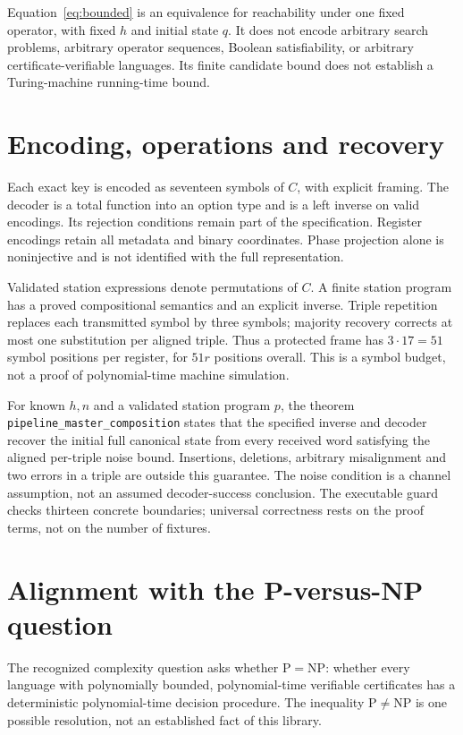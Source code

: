 \documentclass[11pt]{article}
\begin{document}
Equation~\eqref{eq:bounded} is an equivalence for reachability under one fixed
operator, with fixed $h$ and initial state $q$. It does not encode arbitrary
search problems, arbitrary operator sequences, Boolean satisfiability, or
arbitrary certificate-verifiable languages. Its finite candidate bound does
not establish a Turing-machine running-time bound.

\section{Encoding, operations and recovery}
Each exact key is encoded as seventeen symbols of $C$, with explicit framing.
The decoder is a total function into an option type and is a left inverse on
valid encodings. Its rejection conditions remain part of the specification.
Register encodings retain all metadata and binary coordinates. Phase projection
alone is noninjective and is not identified with the full representation.

Validated station expressions denote permutations of $C$. A finite station
program has a proved compositional semantics and an explicit inverse. Triple
repetition replaces each transmitted symbol by three symbols; majority recovery
corrects at most one substitution per aligned triple. Thus a protected frame has
$3\cdot17=51$ symbol positions per register, for $51r$ positions overall.
This is a symbol budget, not a proof of polynomial-time machine simulation.

For known $h,n$ and a validated station program $p$, the theorem
\texttt{pipeline\_master\_composition} states that the specified inverse and
decoder recover the initial full canonical state from every received word
satisfying the aligned per-triple noise bound. Insertions, deletions, arbitrary
misalignment and two errors in a triple are outside this guarantee. The noise
condition is a channel assumption, not an assumed decoder-success conclusion.
The executable guard checks thirteen concrete boundaries; universal correctness
rests on the proof terms, not on the number of fixtures.

\section{Alignment with the P-versus-NP question}
The recognized complexity question asks whether $\mathrm P=\mathrm{NP}$:
whether every language with polynomially bounded, polynomial-time verifiable
certificates has a deterministic polynomial-time decision procedure. The
inequality $\mathrm P\ne\mathrm{NP}$ is one possible resolution, not an
established fact of this library.
\end{document}
